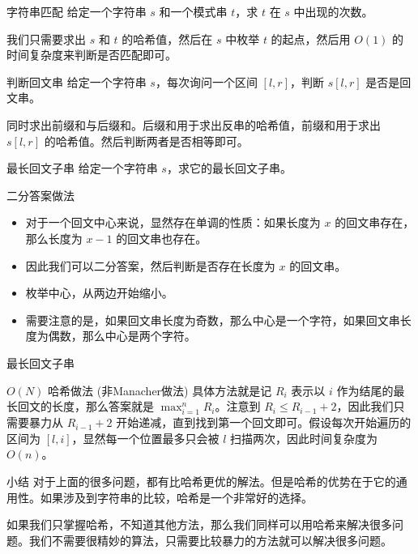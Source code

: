 \documentclass{ldr-simple-gray}
\begin{document}
  \begin{frame}{字符串匹配}
    给定一个字符串 $s$ 和一个模式串 $t$，求 $t$ 在 $s$ 中出现的次数。\newline

    我们只需要求出 $s$ 和 $t$ 的哈希值，然后在 $s$ 中枚举 $t$ 的起点，然后用 $O(1)$ 的时间复杂度来判断是否匹配即可。
  \end{frame}

  \begin{frame}{判断回文串}
    给定一个字符串 $s$，每次询问一个区间 $[l,r]$，判断 $s[l,r]$ 是否是回文串。\newline

    同时求出前缀和与后缀和。后缀和用于求出反串的哈希值，前缀和用于求出 $s[l,r]$ 的哈希值。然后判断两者是否相等即可。
  \end{frame}
  
  \begin{frame}{最长回文子串}
    给定一个字符串 $s$，求它的最长回文子串。
  
    \begin{block}{二分答案做法}
      \begin{itemize}
        \item 对于一个回文中心来说，显然存在单调的性质：如果长度为 $x$ 的回文串存在，那么长度为 $x-1$ 的回文串也存在。
        \item 因此我们可以二分答案，然后判断是否存在长度为 $x$ 的回文串。
        \item 枚举中心，从两边开始缩小。
        \item 需要注意的是，如果回文串长度为奇数，那么中心是一个字符，如果回文串长度为偶数，那么中心是两个字符。
      \end{itemize}
    \end{block}
  \end{frame}

  \begin{frame}{最长回文子串}
    \begin{block}{$O(N)$ 哈希做法 (非Manacher做法)}
      具体方法就是记 $R_i$ 表示以 $i$ 作为结尾的最长回文的长度，那么答案就是 
      $\max_{i=1}^nR_i$。注意到 $R_i\leq R_{i-1}+2$，因此我们只需要暴力从 $R_{i-1}+2$ 开始递减，直到找到第一个回文即可。假设每次开始遍历的区间为 $[l,i]$，显然每一个位置最多只会被 $l$ 扫描两次，因此时间复杂度为 $O(n)$。
    \end{block}
  \end{frame}

  \begin{frame}{小结}
    对于上面的很多问题，都有比哈希更优的解法。但是哈希的优势在于它的通用性。如果涉及到字符串的比较，哈希是一个非常好的选择。\newline

    如果我们只掌握哈希，不知道其他方法，那么我们同样可以用哈希来解决很多问题。我们不需要很精妙的算法，只需要比较暴力的方法就可以解决很多问题。
  \end{frame}
\end{document}
